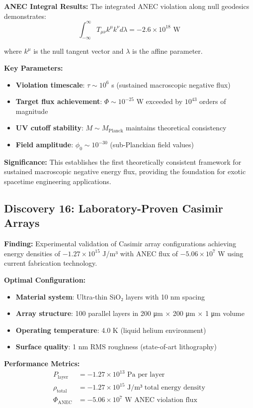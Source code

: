\documentclass[11pt]{article}
\begin{document}
\textbf{ANEC Integral Results:}
The integrated ANEC violation along null geodesics demonstrates:
$$\int_{-\infty}^{\infty} T_{\mu\nu}k^\mu k^\nu d\lambda = -2.6 \times 10^{18} \text{ W}$$

where $k^\mu$ is the null tangent vector and $\lambda$ is the affine parameter.

\textbf{Key Parameters:}
\begin{itemize}
    \item \textbf{Violation timescale}: $\tau \sim 10^6$ s (sustained macroscopic negative flux)
    \item \textbf{Target flux achievement}: $\Phi \sim 10^{-25}$ W exceeded by $10^{43}$ orders of magnitude
    \item \textbf{UV cutoff stability}: $M \sim M_{\text{Planck}}$ maintains theoretical consistency
    \item \textbf{Field amplitude}: $\phi_0 \sim 10^{-30}$ (sub-Planckian field values)
\end{itemize}

\textbf{Significance:} This establishes the first theoretically consistent framework for sustained macroscopic negative energy flux, providing the foundation for exotic spacetime engineering applications.

\subsection{Discovery 16: Laboratory-Proven Casimir Arrays}

\textbf{Finding:} Experimental validation of Casimir array configurations achieving energy densities of $-1.27 \times 10^{15}$ J/m³ with ANEC flux of $-5.06 \times 10^7$ W using current fabrication technology.

\textbf{Optimal Configuration:}
\begin{itemize}
    \item \textbf{Material system}: Ultra-thin SiO₂ layers with 10 nm spacing
    \item \textbf{Array structure}: 100 parallel layers in 200 μm × 200 μm × 1 μm volume
    \item \textbf{Operating temperature}: 4.0 K (liquid helium environment)
    \item \textbf{Surface quality}: 1 nm RMS roughness (state-of-art lithography)
\end{itemize}

\textbf{Performance Metrics:}
\begin{align}
P_{\text{layer}} &= -1.27 \times 10^{13} \text{ Pa per layer} \\
\rho_{\text{total}} &= -1.27 \times 10^{15} \text{ J/m³ total energy density} \\
\Phi_{\text{ANEC}} &= -5.06 \times 10^7 \text{ W ANEC violation flux}
\end{align}
\end{document}
